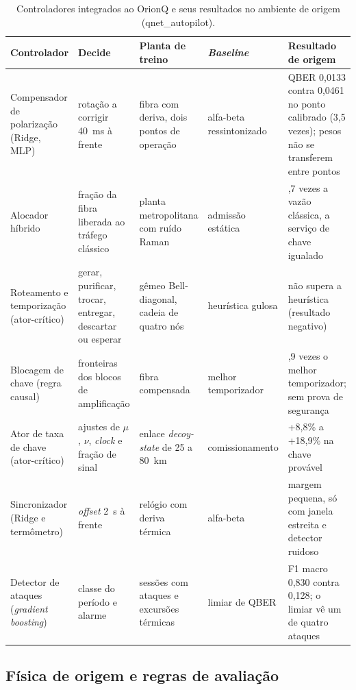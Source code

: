 \documentclass[12pt]{article}
\begin{document}
\begin{table}[ht]
\centering
\caption{Controladores integrados ao OrionQ e seus resultados no ambiente de
origem (qnet\_autopilot).}
\label{tab:controladores}
\scriptsize
\setlength{\tabcolsep}{3pt}
\begin{tabular}{>{\raggedright\arraybackslash}p{2.4cm}>{\raggedright\arraybackslash}p{2.9cm}>{\raggedright\arraybackslash}p{2.6cm}>{\raggedright\arraybackslash}p{2.15cm}>{\raggedright\arraybackslash}p{3.6cm}}
\toprule
Controlador & Decide & Planta de treino & \textit{Baseline} & Resultado de origem \\
\midrule
Compensador de polarização (Ridge, MLP) & rotação a corrigir 40~ms à frente & fibra com deriva, dois pontos de operação & alfa-beta ressintonizado & QBER 0,0133 contra 0,0461 no ponto calibrado (3,5 vezes); pesos não se transferem entre pontos \\
Alocador híbrido & fração da fibra liberada ao tráfego clássico & planta metropolitana com ruído Raman & admissão estática & 2,7 vezes a vazão clássica, a serviço de chave igualado \\
Roteamento e temporização (ator-crítico) & gerar, purificar, trocar, entregar, descartar ou esperar & gêmeo Bell-diagonal, cadeia de quatro nós & heurística gulosa & não supera a heurística (resultado negativo) \\
Blocagem de chave (regra causal) & fronteiras dos blocos de amplificação & fibra compensada & melhor temporizador & 7,9 vezes o melhor temporizador; sem prova de segurança \\
Ator de taxa de chave (ator-crítico) & ajustes de $\mu$, $\nu$, \textit{clock} e fração de sinal & enlace \textit{decoy-state} de 25 a 80~km & comissionamento & +8,8\% a +18,9\% na chave provável \\
Sincronizador (Ridge e termômetro) & \textit{offset} 2~s à frente & relógio com deriva térmica & alfa-beta & margem pequena, só com janela estreita e detector ruidoso \\
Detector de ataques (\textit{gradient boosting}) & classe do período e alarme & sessões com ataques e excursões térmicas & limiar de QBER & F1 macro 0,830 contra 0,128; o limiar vê um de quatro ataques \\
\bottomrule
\end{tabular}
\end{table}

\subsection{Física de origem e regras de avaliação}
\end{document}
